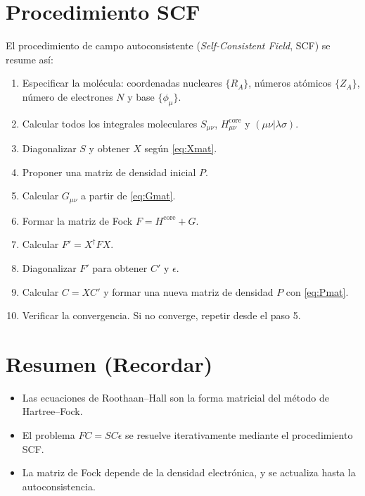 \documentclass[11pt]{article}
\begin{document}
\section{Procedimiento SCF}
\label{sec:scf}

El procedimiento de campo autoconsistente (\textit{Self-Consistent Field}, SCF) se resume así:
\begin{enumerate}
\item Especificar la molécula: coordenadas nucleares \(\{R_A\}\), números atómicos \(\{Z_A\}\), número de electrones \(N\) y base \(\{\phi_\mu\}\).
\item Calcular todos los integrales moleculares \(S_{\mu\nu}\), \(H_{\mu\nu}^{\text{core}}\) y \((\mu\nu|\lambda\sigma)\).
\item Diagonalizar \(S\) y obtener \(X\) según \eqref{eq:Xmat}.
\item Proponer una matriz de densidad inicial \(P\).
\item Calcular \(G_{\mu\nu}\) a partir de \eqref{eq:Gmat}.
\item Formar la matriz de Fock \(F = H^{\text{core}} + G\).
\item Calcular \(F' = X^\dagger F X\).
\item Diagonalizar \(F'\) para obtener \(C'\) y \(\epsilon\).
\item Calcular \(C = X C'\) y formar una nueva matriz de densidad \(P\) con \eqref{eq:Pmat}.
\item Verificar la convergencia. Si no converge, repetir desde el paso 5.
\end{enumerate}

\section*{Resumen (Recordar)}
\begin{itemize}
\item Las ecuaciones de Roothaan–Hall son la forma matricial del método de Hartree–Fock.
\item El problema \(FC=SC\epsilon\) se resuelve iterativamente mediante el procedimiento SCF.
\item La matriz de Fock depende de la densidad electrónica, y se actualiza hasta la autoconsistencia.
\end{itemize}
\end{document}
